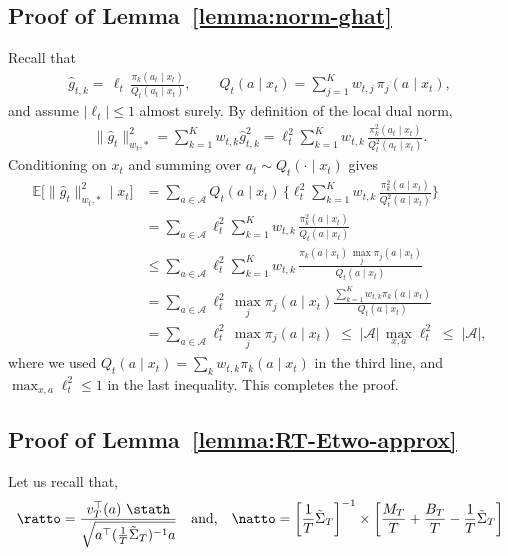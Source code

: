 \documentclass[11pt,letterpaper]{article}
\newcommand{\Exs}{\mathbb{E}}
\newcommand{\PT}{\tilde{\Sigma}_T}
\newcommand{\loss}{\ell}
\theoremstyle{plain}
\theoremstyle{definition}  %
\begin{document}
\subsection*{Proof of Lemma~\ref{lemma:norm-ghat}}
Recall that 
\begin{align*}
  \widehat g_{t,k}
  = \,\loss_t\,\frac{\pi_k(a_t\mid x_t)}{Q_t(a_t\mid x_t)},
  \qquad
  Q_t(a\mid x_t) = \sum_{j=1}^K w_{t,j}\,\pi_j(a\mid x_t),
\end{align*}
and assume $|\loss_t|\le 1$ almost surely.
By definition of the local dual norm,
\begin{align*}
  \|\widehat g_t\|_{w_t,*}^2
  = \sum_{k=1}^K w_{t,k}\widehat g_{t,k}^2
  = \loss_t^2 \sum_{k=1}^K
      w_{t,k}\,\frac{\pi_k^2(a_t\mid x_t)}{Q_t^2(a_t\mid x_t)}.
\end{align*}
Conditioning on $x_t$ and summing over $a_t\sim Q_t(\cdot\mid x_t)$ gives
\begin{align*}
  \Exs\big[\|\widehat g_t\|_{w_t,*}^2 \mid x_t\big]
  &= \sum_{a\in\mathcal{A}}
      Q_t(a\mid x_t)\,
      \Big\{
        \loss_t^2 \sum_{k=1}^K
        w_{t,k}\,\frac{\pi_k^2(a\mid x_t)}{Q_t^2(a\mid x_t)}
      \Big\} \\
  &= \sum_{a\in\mathcal{A}}
      \loss_t^2
      \sum_{k=1}^K
      w_{t,k}\,\frac{\pi_k^2(a\mid x_t)}{Q_t(a\mid x_t)} \\
  &\le \sum_{a\in\mathcal{A}}
      \loss_t^2
      \sum_{k=1}^K
      w_{t,k}\,\frac{\pi_k(a\mid x_t)\,\max_j \pi_j(a\mid x_t)}{Q_t(a\mid x_t)} \\
  &= \sum_{a\in\mathcal{A}}
      \loss_t^2\,\max_j \pi_j(a\mid x_t)
      \frac{\sum_{k=1}^K w_{t,k}\pi_k(a\mid x_t)}{Q_t(a\mid x_t)} \\
  &= \sum_{a\in\mathcal{A}}
      \loss_t^2\,\max_j \pi_j(a\mid x_t)
      \;\le\; |\mathcal{A}|\,\max_{x,a} \loss_t^2
      \;\le\; |\mathcal{A}|,
\end{align*}
where we used \(Q_t(a\mid x_t)=\sum_k w_{t,k}\pi_k(a\mid x_t)\) in the third line,
and $\max_{x,a} \loss_t^2\le 1$ in the last inequality. This completes the proof. 


\subsection*{ Proof of Lemma~\ref{lemma:RT-Etwo-approx}}

\noindent Let us recall that,
\begin{align}\label{eqn:rat-nat}
    \ratto = \frac{v_T^\top (a) \ \stath}{  \sqrt{a^\top (\frac{1}{T}\PT)^{-1}  a}}
    \quad \text{and,}
    \quad
    \natto = \left[\frac{1}{T} \PT \right]^{-1} \times \left[ \frac{M_T}{T} + \frac{B_T}{T}-\frac{1}{T} \PT\right]
\end{align}
\end{document}
